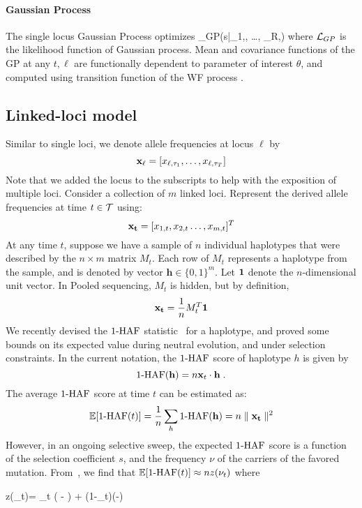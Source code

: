 \paragraph{Gaussian Process}
The single locus Gaussian Process \cite{} optimizes
\beq
\Lc_{GP}(s|\bfx_{1,\ell}, \dots, \bfx_{R,\ell})
\eeq
where ${\cal L}_{GP}$ is the likelihood function  of Gaussian process. Mean and covariance functions of the GP at any $t,\ell$ are functionally dependent to parameter of interest $\theta$, and computed using transition function of the WF process \cite{Terhorst15}.

\subsection*{Linked-loci model}
Similar to single loci, we denote allele frequencies at locus $\ell$ by
\[
{\bf x_{\ell}} = [x_{\ell,\tau_1},\ldots,x_{\ell,\tau_T}]
\]
Note that we added the locus to the subscripts to help with the
exposition of multiple loci. Consider a collection of $m$ linked
loci. Represent the derived allele frequencies at time $t\in {\cal T}$
using:
\[
{\bf x_t} = [x_{1,t},x_{2,t}\ldots,x_{m,t}]^T 
\]
At any time $t$, suppose we have a sample of $n$ individual haplotypes
that were described by the $n\times m$ matrix $M_t$. Each row of $M_t$
represents a haplotype from the sample, and is denoted by vector
$\mathbf{h} \in \{0,1\}^m$. Let ${\mathbf{1}}$ denote the
$n$-dimensional unit vector. In Pooled sequencing, $M_t$ is hidden,
but by definition,
\[
 \mathbf{x_t} = \frac{1}{n} M_t^T{\mathbf{1}}
\]
We recently devised the $1\text{-HAF}$ statistic~\cite{Ronen2015} for a
haplotype, and proved some bounds on its expected value during neutral
evolution, and under selection constraints. In the current notation,
the $1\text{-HAF}$ score of haplotype $h$ is given by
\begin{equation}
1\text{-HAF}(\mathbf{h})=n{\mathbf x}_t \cdot \mathbf{h}
\;.
\label{eq:1-HAF_SNPmatrix}
\end{equation}
The average $1\text{-HAF}$ score at time $t$ can be estimated as:
\begin{equation} 
\mathbb{E}[1\text{-HAF}(t)]=\frac{1}{n}\sum_h 1\text{-HAF}(\mathbf{h}) = n\parallel \mathbf{x_t}\parallel^2
\end{equation} 
However, in an ongoing selective sweep, the expected $1\text{-HAF}$ score is
a function of the selection coefficient $s$, and the frequency $\nu$
of the carriers of the favored mutation. From~\cite{Ronen2015}, we
find that $ \mathbb{E}[1\text{-HAF}(t)]\approx nz(\nu_t)$ where

\beq
z(\nu_t)= \theta \nu_t \left( - \right) +
 \theta (1-\nu_t)\left(-\right)
  \label{eq:hafscorepooled}
\eeq

